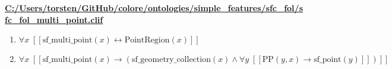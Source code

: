 \documentclass{article}
\begin{document}
\textbf{\url{C:/Users/torsten/GitHub/colore/ontologies/simple\_features/sfc\_fol/sfc\_fol\_multi\_point.clif}}

\begin{enumerate}
\item $\forall x\;  \left[ \left[ \textrm{sf\_multi\_point}(x) \leftrightarrow \textrm{PointRegion}(x) \right] \right]$
\item $\forall x\;  \left[ \left[ \textrm{sf\_multi\_point}(x) \rightarrow \left(\textrm{sf\_geometry\_collection}(x) \land \forall y\;  \left[ \left[ \textrm{PP}(y,x) \rightarrow \textrm{sf\_point}(y) \right] \right]\right) \right] \right]$
\end{enumerate}
\end{document}
